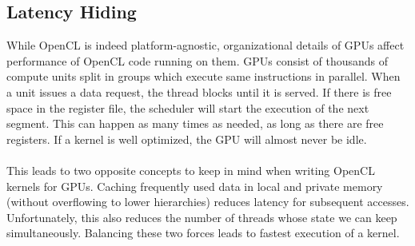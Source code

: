 \subsection{Latency Hiding}

While OpenCL is indeed platform-agnostic, organizational details of GPUs affect performance of OpenCL code running on them. GPUs consist of thousands of compute units split in groups which execute same instructions in parallel. When a unit issues a data request, the thread blocks until it is served. If there is free space in the register file, the scheduler will start the execution of the next segment. This can happen as many times as needed, as long as there are free registers. If a kernel is well optimized, the GPU will almost never be idle.\\
\\
This leads to two opposite concepts to keep in mind when writing OpenCL kernels for GPUs. Caching frequently used data in local and private memory (without overflowing to lower hierarchies) reduces latency for subsequent accesses. Unfortunately, this also reduces the number of threads whose state we can keep simultaneously. Balancing these two forces leads to fastest execution of a kernel.\\
